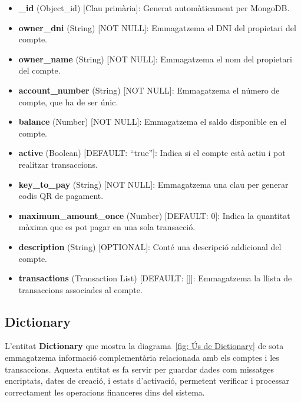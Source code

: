 \documentclass[a4paper,12pt,twoside]{ThesisStyle}
\begin{document}
\begin{itemize}
    \item \textbf{\_id} (Object\_id) [Clau primària]: Generat automàticament per MongoDB.
    \item \textbf{owner\_dni} (String) [NOT NULL]: Emmagatzema el DNI del propietari del compte.
    \item \textbf{owner\_name} (String) [NOT NULL]: Emmagatzema el nom del propietari del compte.
    \item \textbf{account\_number} (String) [NOT NULL]: Emmagatzema el número de compte, que ha de ser únic.
    \item \textbf{balance} (Number) [NOT NULL]: Emmagatzema el saldo disponible en el compte.
    \item \textbf{active} (Boolean) [DEFAULT: ``true'']: Indica si el compte està actiu i pot realitzar transaccions.
    \item \textbf{key\_to\_pay} (String) [NOT NULL]: Emmagatzema una clau per generar codis QR de pagament.
    \item \textbf{maximum\_amount\_once} (Number) [DEFAULT: 0]: Indica la quantitat màxima que es pot pagar en una sola transacció.
    \item \textbf{description} (String) [OPTIONAL]: Conté una descripció addicional del compte.
    \item \textbf{transactions} (Transaction List) [DEFAULT: []]: Emmagatzema la llista de transaccions associades al compte.
\end{itemize}


\clearpage


\subsection{Dictionary}
\label{subsec: Dictionary}

L'entitat \textbf{Dictionary} que mostra la diagrama~\ref{fig: Ús de Dictionary} de sota emmagatzema informació complementària relacionada amb els comptes i les transaccions. Aquesta entitat es fa servir per guardar dades com missatges encriptats, dates de creació, i estats d'activació, permetent verificar i processar correctament les operacions financeres dins del sistema.\\
\end{document}
